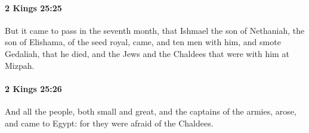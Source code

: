 		\paragraph{2 Kings 25:25} %
			\label{2KINGS-25-25}

			But it came to pass in the seventh month, that Ishmael the son of Nethaniah, the son of Elishama, of the seed royal, came, and ten men with him, and smote Gedaliah, that he died, and the Jews and the Chaldees that were with him at Mizpah.


		\paragraph{2 Kings 25:26} %
			\label{2KINGS-25-26}

			And all the people, both small and great, and the captains of the armies, arose, and came to Egypt: for they were afraid of the Chaldees.

